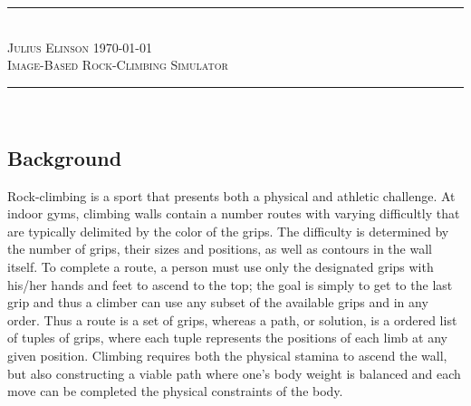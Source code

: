 \documentclass[pdftex,12pt]{article}
\newcommand{\horbar}{\rule{\linewidth}{0.4mm}}
\theoremstyle{definition}
\theoremstyle{remark}
\begin{document}
\begin{center}
\horbar \\
\textsc{Julius Elinson} \hfill \textsc{\today}\\[.1cm]
\textsc{\Large{Image-Based Rock-Climbing Simulator}}\\[-.1cm]
\horbar \\[.4cm]
\end{center}

\subsection*{Background}
Rock-climbing is a sport that presents both a physical and athletic challenge. At indoor gyms, climbing walls contain a number routes with varying difficultly that are typically delimited by the color of the grips. The difficulty is determined by the number of grips, their sizes and positions, as well as contours in the wall itself. To complete a route, a person must use only the designated grips with his/her hands and feet to ascend to the top; the goal is simply to get to the last grip and thus a climber can use any subset of the available grips and in any order. Thus a route is a set of grips, whereas a path, or solution, is a ordered list of tuples of grips, where each tuple represents the positions of each limb at any given position. Climbing requires both the physical stamina to ascend the wall, but also constructing a viable path where one's body weight is balanced and each move can be completed the physical constraints of the body.
\end{document}

